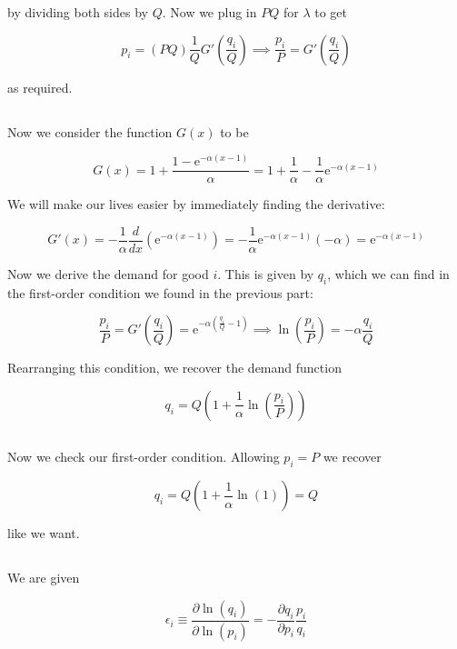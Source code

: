 \documentclass[12pt, letterpaper]{article}
\newcommand{\e}{\mathrm{e}}
\begin{document}
    by dividing both sides by \(Q\). Now we plug in \(PQ\) for \(\lambda\) to get 

    \[ p_i = (P Q) \frac{1}{Q} G'\left(\frac{q_i}{Q}\right) \implies \frac{p_i}{P} = G'\left(\frac{q_i}{Q}\right)   \]

    as required.

    \subsection{}

    Now we consider the function \(G(x)\) to be

    \[ G(x) = 1 + \frac{1 - \e^{-\alpha(x - 1)}}{\alpha} = 1 + \frac{1}{\alpha} - \frac{1}{\alpha} \e^{-\alpha(x - 1)}   \]

    We will make our lives easier by immediately finding the derivative:

    \[ G'(x) = - \frac{1}{\alpha} \frac{d}{dx} \left(  \e^{-\alpha(x - 1)}  \right) = - \frac{1}{\alpha} \e^{-\alpha (x - 1)} (- \alpha) = \e^{-\alpha (x - 1)}   \]

    Now we derive the demand for good \(i\). This is given by \(q_i\), which we can find in the first-order condition we found in the previous part:

    \[ \frac{p_i}{P} = G'\left(\frac{q_i}{Q}\right) = \e^{-\alpha (\frac{q_i}{Q} - 1)} \implies \ln(\frac{p_i}{P}) = - \alpha \frac{q_i}{Q}     \]

    Rearranging this condition, we recover the demand function

    \[ q_i = Q \left( 1 + \frac{1}{\alpha} \ln(\frac{p_i}{P}) \right)      \]

    \subsection{}

    Now we check our first-order condition. Allowing \(p_i = P\) we recover

    \[ q_i = Q \left(1 + \frac{1}{\alpha} \ln(1) \right) = Q   \]

    like we want.

    \subsection{}

    We are given 

    \[ \epsilon_i \equiv \frac{\partial \ln(q_i)}{\partial \ln(p_i)} = - \frac{\partial q_i}{\partial p_i} \frac{p_i}{q_i}    \]
\end{document}
